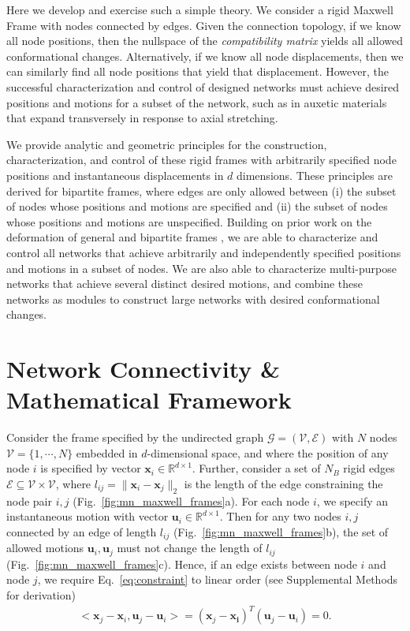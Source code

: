 \documentclass[%
preprint,
 amsmath,amssymb,
 aps,
]{revtex4-1}
\newcommand{\mc}{\mathcal}
\newcommand{\real}{\mathbb{R}}
\begin{document}
Here we develop and exercise such a simple theory. We consider a rigid Maxwell Frame with nodes connected by edges. Given the connection topology, if we know all node positions, then the nullspace of the \emph{compatibility matrix} \cite{lubensky2015phonons} yields all allowed conformational changes. Alternatively, if we know all node displacements, then we can similarly find all node positions that yield that displacement. However, the successful characterization and control of designed networks must achieve desired positions and motions for a subset of the network, such as in auxetic materials that expand transversely in response to axial stretching.

We provide analytic and geometric principles for the construction, characterization, and control of these rigid frames with arbitrarily specified node positions and instantaneous displacements in $d$ dimensions. These principles are derived for bipartite frames, where edges are only allowed between (i) the subset of nodes whose positions and motions are specified and (ii) the subset of nodes whose positions and motions are unspecified. Building on prior work on the deformation of general and bipartite frames \cite{roth1981,whiteley1984,bolker1980}, we are able to characterize and control all networks that achieve arbitrarily and independently specified positions and motions in a subset of nodes. We are also able to characterize multi-purpose networks that achieve several distinct desired motions, and combine these networks as modules to construct large networks with desired conformational changes. 


\section{Network Connectivity \& Mathematical Framework}

Consider the frame specified by the undirected graph $\mc G = (\mc V, \mc E)$ with $N$ nodes $\mc V = \{1,\dotsm,N\}$ embedded in $d$-dimensional space, and where the position of any node $i$ is specified by vector $\bm{x}_i \in \real^{d\times1}$. Further, consider a set of $N_B$ rigid edges $\mc E \subseteq \mc V \times \mc V$, where $l_{ij} = \|\bm{x}_i-\bm{x}_j\|_2$ is the length of the edge constraining the node pair $i,j$ (Fig.~\ref{fig:mn_maxwell_frames}a). For each node $i$, we specify an instantaneous motion with vector $\bm{u}_i \in \real^{d\times1}$. Then for any two nodes $i,j$ connected by an edge of length $l_{ij}$ (Fig.~\ref{fig:mn_maxwell_frames}b), the set of allowed motions $\bm{u}_i, \bm{u}_j$ must not change the length of $l_{ij}$ (Fig.~\ref{fig:mn_maxwell_frames}c). Hence, if an edge exists between node $i$ and node $j$, we require Eq.~\ref{eq:constraint} to linear order (see Supplemental Methods for derivation)
\begin{align}
\label{eq:constraint}
<\bm{x}_j - \bm{x}_i, \bm{u}_j - \bm{u}_i> = (\bm{x}_j - \bm{x_i})^T (\bm{u}_j - \bm{u}_i) = 0.
\end{align}
\end{document}
